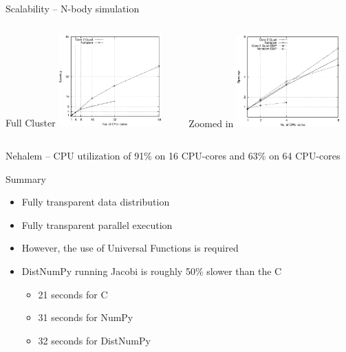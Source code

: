 \documentclass{beamer}
\begin{document}

\begin{frame}{Scalability -- N-body simulation}
\begin{scriptsize}
\begin{columns}
  \begin{column}{0.5\textwidth}
  \begin{center}
    \hspace{21px}Full Cluster
    \includegraphics[width=150px]{../gfx/NbodyStrong}
  \end{center}
  \end{column}
  \begin{column}{0.5\textwidth}
  \begin{center}
    \hspace{23px}Zoomed in
    \includegraphics[width=150px]{../gfx/NbodyStrongSMP}
  \end{center}
  \end{column}
\end{columns}
\begin{center}
Nehalem -- CPU utilization of 91\% on 16 CPU-cores and 63\% on 64 CPU-cores
\end{center}
\end{scriptsize}
\end{frame}


\begin{frame}{Summary}
\begin{itemize}
  \item Fully transparent data distribution
  \item Fully transparent parallel execution
  \item However, the use of Universal Functions is required
  \item DistNumPy running Jacobi is roughly 50\% slower than the C
  \begin{itemize}
    \item 21 seconds for C
    \item 31 seconds for NumPy
    \item 32 seconds for DistNumPy
  \end{itemize}
\end{itemize}
\end{frame}
\end{document}
